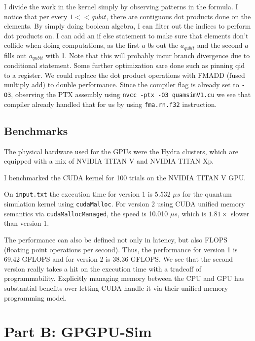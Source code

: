 \documentclass{article}
\begin{document}
I divide the work in the kernel simply by observing patterns in the formula. I notice that per every $1 << qubit$, there are contiguous dot products done on the elements. By simply doing boolean algebra, I can filter out the indices to perform dot products on. I can add an if else statement to make sure that elements don't collide when doing computations, as the first $a$ 0s out the $a_{qubit}$ and the second $a$ fills out $a_{qubit}$ with 1. Note that this will probably incur branch divergence due to conditional statement. Some further optimization sare done such as pinning qid to a register. We could replace the dot product operations with FMADD (fused multiply add) to double performance. Since the compiler flag is already set to \verb|-O3|, observing the PTX assembly using \verb|nvcc -ptx -O3 quamsimV1.cu| we see that compiler already handled that for us by using \verb|fma.rn.f32| instruction.

\subsection{Benchmarks}
The physical hardware used for the GPUs were the Hydra clusters, which are equipped with a mix of NVIDIA TITAN V and NVIDIA TITAN Xp.

I benchmarked the CUDA kernel for 100 trials on the NVIDIA TITAN V GPU.

On \verb|input.txt| the execution time for version 1 is 5.532 $\mu s$ for the quantum simulation kernel using \verb|cudaMalloc|. For version 2 using CUDA unified memory semantics via \verb|cudaMallocManaged|, the speed is 10.010 $\mu s$, which is $1.81 \times$ slower than version 1.

The performance can also be defined not only in latency, but also FLOPS (floating point operations per second). Thus, the performance for version 1 is 69.42 GFLOPS and for version 2 is 38.36 GFLOPS. We see that the second version really takes a hit on the execution time with a tradeoff of programmability. Explicitly managing memory between the CPU and GPU has substantial benefits over letting CUDA handle it via their unified memory programming model.

\section{Part B: GPGPU-Sim}
\end{document}
